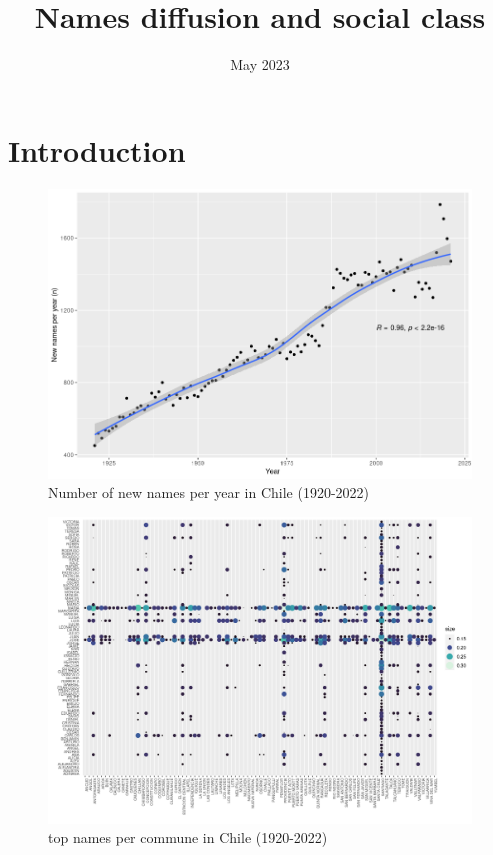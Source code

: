 



\title{Names diffusion and social class}
\author{}
\date{May 2023}



\maketitle

\section{Introduction}


\begin{figure}[H]
    \centering
    \includegraphics[width=13cm]{plot/new_names_year.png}
    \caption{Number of new names per year in Chile (1920-2022)}
    \label{}
\end{figure}


\begin{figure}[H]
    \centering
    \includegraphics[width=13cm]{plot/name_commune.png}
    \caption{top names per commune in Chile (1920-2022)}
    \label{}
\end{figure}



